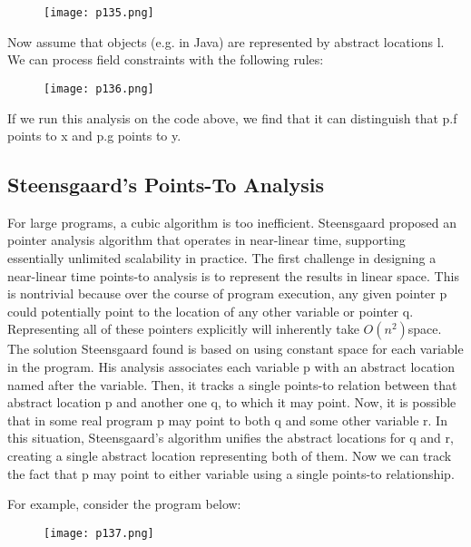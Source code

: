 \begin{figure}[H]
	\centering
	\texttt{[image: p135.png]}
	\caption{}
	\label{fig:p135}
\end{figure}

Now assume that objects (e.g. in Java) are represented by abstract locations l. We can process
field constraints with the following rules:

\begin{figure}[H]
	\centering
	\texttt{[image: p136.png]}
	\caption{}
	\label{fig:p136}
\end{figure}


If we run this analysis on the code above, we find that it can distinguish that p.f points to x
and p.g points to y.


\subsection{Steensgaard’s Points-To Analysis}

For large programs, a cubic algorithm is too inefficient. Steensgaard proposed an pointer analysis
algorithm that operates in near-linear time, supporting essentially unlimited scalability in practice.
The first challenge in designing a near-linear time points-to analysis is to represent the results
in linear space. This is nontrivial because over the course of program execution, any given pointer
p could potentially point to the location of any other variable or pointer q. Representing all of
these pointers explicitly will inherently take $O(n^2)$space.
The solution Steensgaard found is based on using constant space for each variable in the program. His analysis associates each variable p with an abstract location named after the variable.
Then, it tracks a single points-to relation between that abstract location p and another one q, to
which it may point. Now, it is possible that in some real program p may point to both q and some
other variable r. In this situation, Steensgaard’s algorithm unifies the abstract locations for q and
r, creating a single abstract location representing both of them. Now we can track the fact that p
may point to either variable using a single points-to relationship.

For example, consider the program below:

\begin{figure}[H]
	\centering
	\texttt{[image: p137.png]}
	\caption{}
	\label{fig:p137}
\end{figure}

